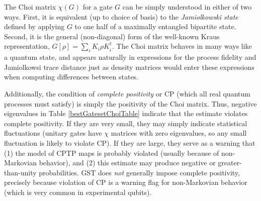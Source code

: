 \documentclass{article}[11pt]
\begin{document}
The Choi matrix $\chi(G)$ for a gate $G$ can be simply understood in either of two ways.  First, it is equivalent (up to choice of basis) to the \emph{Jamiolkowski state} defined by applying $G$ to one half of a maximally entangled bipartite state.  Second, it is the general (non-diagonal) form of the well-known Kraus representation, $G[\rho] = \sum_i{K_i\rho K_i^\dagger}$.  The Choi matrix behaves in many ways like a quantum state, and appears naturally in expressions for the process fidelity and Jamiolkowsi trace distance just as density matrices would enter these expressions when computing differences between states.  

Additionally, the condition of \emph{complete positivity} or CP (which all real quantum processes must satisfy) is simply the positivity of the Choi matrix.  Thus, negative eigenvalues in Table \ref{bestGatesetChoiTable} indicate that the estimate violates complete positivity.  If they are very small, they may simply indicate statistical fluctuations (unitary gates have $\chi$ matrices with zero eigenvalues, so any small fluctuation is likely to violate CP).  If they are large, they serve as a warning that (1) the model of CPTP maps is probably violated (usually because of non-Markovian behavior), and (2) this estimate may produce negative or greater-than-unity probabilities.  GST does \emph{not} generally impose complete positivity, precisely because violation of CP is a warning flag for non-Markovian behavior (which is very common in experimental qubits).
\end{document}
